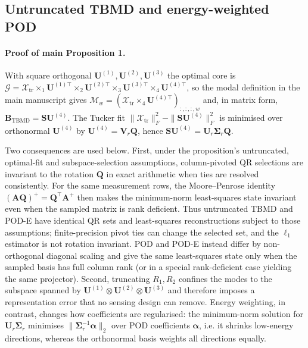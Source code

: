 \subsection{Untruncated TBMD and energy-weighted POD}
\paragraph{Proof of main Proposition 1.}
With square orthogonal $\mathbf{U}^{(1)},\mathbf{U}^{(2)},\mathbf{U}^{(3)}$ the optimal core is $\mathcal{G}=\mathcal{X}_{\mathrm{tr}}\times_1\mathbf{U}^{(1)\top}\times_2\mathbf{U}^{(2)\top}\times_3\mathbf{U}^{(3)\top}\times_4\mathbf{U}^{(4)\top}$, so the modal definition in the main manuscript gives $\mathcal{M}_w=(\mathcal{X}_{\mathrm{tr}}\times_4\mathbf{U}^{(4)\top})_{:,:,:,w}$ and, in matrix form, $\mathbf{B}_{\mathrm{TBMD}}=\mathbf{S}\mathbf{U}^{(4)}$. The Tucker fit $\|\mathcal{X}_{\mathrm{tr}}\|_F^2-\|\mathbf{S}\mathbf{U}^{(4)}\|_F^2$ is minimised over orthonormal $\mathbf{U}^{(4)}$ by $\mathbf{U}^{(4)}=\mathbf{V}_r\mathbf{Q}$, hence $\mathbf{S}\mathbf{U}^{(4)}=\mathbf{U}_r\boldsymbol{\Sigma}_r\mathbf{Q}$.

Two consequences are used below. First, under the proposition's untruncated, optimal-fit and subspace-selection assumptions, column-pivoted QR selections are invariant to the rotation $\mathbf{Q}$ in exact arithmetic when ties are resolved consistently. For the same measurement rows, the Moore--Penrose identity $(\mathbf{A}\mathbf{Q})^+=\mathbf{Q}^\top\mathbf{A}^+$ then makes the minimum-norm least-squares state invariant even when the sampled matrix is rank deficient. Thus untruncated TBMD and POD-E have identical QR sets and least-squares reconstructions subject to those assumptions; finite-precision pivot ties can change the selected set, and the $\ell_1$ estimator is not rotation invariant. POD and POD-E instead differ by non-orthogonal diagonal scaling and give the same least-squares state only when the sampled basis has full column rank (or in a special rank-deficient case yielding the same projector). Second, truncating $R_1,R_2$ confines the modes to the subspace spanned by $\mathbf{U}^{(1)}\otimes\mathbf{U}^{(2)}\otimes\mathbf{U}^{(3)}$ and therefore imposes a representation error that no sensing design can remove. Energy weighting, in contrast, changes how coefficients are regularised: the minimum-norm solution for $\mathbf{U}_r\boldsymbol{\Sigma}_r$ minimises $\|\boldsymbol{\Sigma}_r^{-1}\boldsymbol{\alpha}\|_2$ over POD coefficients $\boldsymbol{\alpha}$, i.e. it shrinks low-energy directions, whereas the orthonormal basis weights all directions equally.
